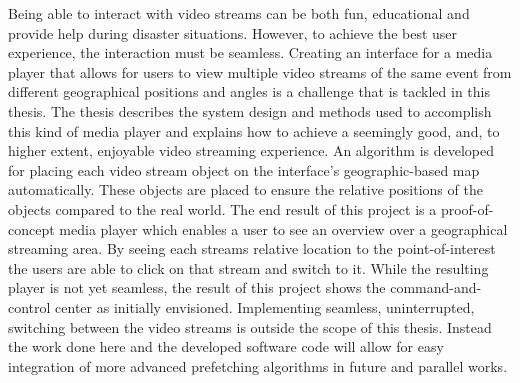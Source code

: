 Being able to interact with video streams can be both fun, educational and provide help during disaster situations. However, to achieve the best user experience, the interaction must be seamless. Creating an interface for a media player that allows for users to view multiple video streams of the same event from different geographical positions and angles is a challenge that is tackled in this thesis. The thesis describes the system design and methods used to accomplish this kind of media player and explains how to achieve a seemingly good, and, to higher extent, enjoyable video streaming experience. An algorithm is developed for placing each video stream object on the interface's geographic-based map automatically. These objects are placed to ensure the relative positions of the objects compared to the real world. The end result of this project is a proof-of-concept media player which enables a user to see an overview over a geographical streaming area. By seeing each streams relative location to the point-of-interest the users are able to click on that stream and switch to it. While the resulting player is not yet seamless, the result of this project shows the command-and-control center as initially envisioned. Implementing seamless, uninterrupted, switching between the video streams is outside the scope of this thesis. Instead the work done here and the developed software code will allow for easy integration of more advanced prefetching algorithms in future and parallel works.